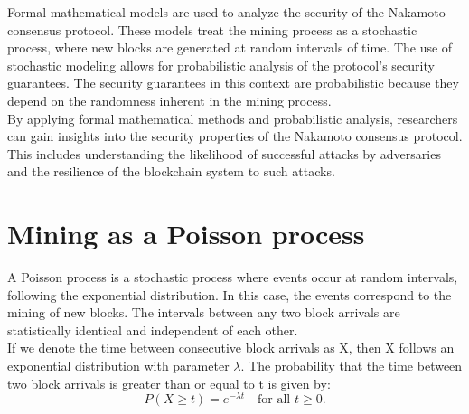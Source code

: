 \documentclass{report}
\begin{document}
Formal mathematical models are used to analyze the security of the Nakamoto consensus protocol. These models treat the mining process as a stochastic process, where new blocks are generated at random intervals of time. The use of stochastic modeling allows for probabilistic analysis of the protocol's security guarantees. The security guarantees in this context are probabilistic because they depend on the randomness inherent in the mining process.\\
By applying formal mathematical methods and probabilistic analysis, researchers can gain insights into the security properties of the Nakamoto consensus protocol. This includes understanding the likelihood of successful attacks by adversaries and the resilience of the blockchain system to such attacks.

\section{Mining as a Poisson process}
A Poisson process is a stochastic process where events occur at random intervals, following the exponential distribution. In this case, the events correspond to the mining of new blocks. The intervals between any two block arrivals are statistically identical and independent of each other.\\
If we denote the time between consecutive block arrivals as X, then X follows an exponential distribution with parameter $\lambda$. The probability that the time between two block arrivals is greater than or equal to t is given by:\\
$$ P(X \geq t) = e^{-\lambda t} \quad \text{for all } t \geq 0. $$
\end{document}
